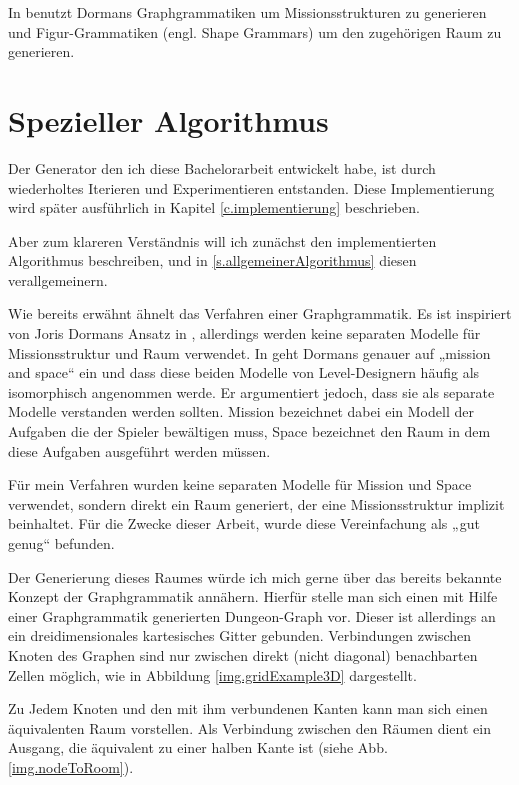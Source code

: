 In \cite{dormansAdventures} benutzt Dormans Graphgrammatiken um Missionsstrukturen zu generieren und Figur-Grammatiken (engl. Shape Grammars) um den zugehörigen Raum zu generieren.

\section{Spezieller Algorithmus}\label{s.speziellerAlgorithmus}

Der Generator den ich diese Bachelorarbeit entwickelt habe, ist durch wiederholtes Iterieren und Experimentieren entstanden. Diese Implementierung wird später ausführlich in Kapitel \ref{c.implementierung} beschrieben.

Aber zum klareren Verständnis will ich zunächst den implementierten Algorithmus beschreiben, und in 
\ref{s.allgemeinerAlgorithmus} diesen verallgemeinern.

Wie bereits erwähnt ähnelt das Verfahren einer Graphgrammatik. Es ist inspiriert von Joris Dormans Ansatz in 
\cite{dormansAdventures},
allerdings werden keine separaten Modelle für Missionsstruktur und Raum verwendet.
In \cite{dormansModelTransformation} geht Dormans genauer auf „mission and space“ ein und dass diese beiden Modelle von Level-Designern häufig als isomorphisch angenommen werde. Er argumentiert jedoch, dass sie als separate Modelle verstanden werden sollten. Mission bezeichnet dabei ein Modell der Aufgaben die der Spieler bewältigen muss, Space bezeichnet den Raum in dem diese Aufgaben ausgeführt werden müssen.

Für mein Verfahren wurden keine separaten Modelle für Mission und Space verwendet, sondern direkt ein Raum generiert, der eine Missionsstruktur implizit beinhaltet. Für die Zwecke dieser Arbeit, wurde diese Vereinfachung als „gut genug“ befunden.

Der Generierung dieses Raumes würde ich mich gerne über das bereits bekannte Konzept der Graphgrammatik annähern. Hierfür stelle man sich einen mit Hilfe einer Graphgrammatik generierten Dungeon-Graph vor. Dieser ist allerdings an ein dreidimensionales kartesisches Gitter gebunden. Verbindungen zwischen Knoten des Graphen sind nur zwischen direkt (nicht diagonal) benachbarten Zellen möglich, wie in Abbildung \ref{img.gridExample3D} dargestellt.


Zu Jedem Knoten und den mit ihm verbundenen Kanten kann man sich einen äquivalenten Raum vorstellen. Als Verbindung zwischen den Räumen dient ein Ausgang, die äquivalent zu einer halben Kante ist (siehe Abb. \ref{img.nodeToRoom}).

